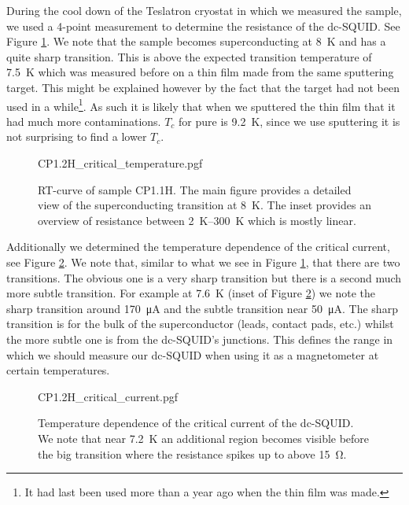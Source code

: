 During the cool down of the Teslatron cryostat in which we measured the sample, we used a 4-point measurement to determine the resistance of the dc-SQUID. See Figure \ref{fig:CP1.1H-SQUID-RT}. We note that the sample becomes superconducting at \qty{8}{\kelvin} and has a quite sharp transition. This is above the expected transition temperature of \qty{7.5}{\kelvin} which was measured before on a thin film made from the same sputtering target. This might be explained however by the fact that the  target had not been used in a while\footnote{It had last been used more than a year ago when the thin film was made.}. As such it is likely that when we sputtered the thin film that it had much more contaminations. $T_c$ for pure  is \qty{9.2}{\kelvin}\cite{maxfieldSuperconductingPenetrationDepth1965}, since we use sputtering it is not surprising to find a lower $T_c$.

\begin{figure}[ht]
	\centering
	{CP1.2H_critical_temperature.pgf}
	\caption{
		RT-curve of sample CP1.1H. The main figure provides a detailed view of the superconducting transition at \qty{8}{\kelvin}. The inset provides an overview of resistance between \qtyrange{2}{300}{\kelvin} which is mostly linear.
	}
	\label{fig:CP1.1H-SQUID-RT}
\end{figure}

Additionally we determined the temperature dependence of the critical current, see Figure \ref{fig:CP1.1H-SQUID-critical-current-temperature-dependence}. We note that, similar to what we see in Figure \ref{fig:CP1.1H-SQUID-RT}, that there are two transitions. The obvious one is a very sharp transition but there is a second much more subtle transition. For example at \qty{7.6}{\kelvin} (inset of Figure \ref{fig:CP1.1H-SQUID-critical-current-temperature-dependence}) we note the sharp transition around \qty{170}{\micro\ampere} and the subtle transition near \qty{50}{\micro\ampere}. The sharp transition is for the bulk of the superconductor (leads, contact pads, etc.) whilst the more subtle one is from the dc-SQUID's junctions. This defines the range in which we should measure our dc-SQUID when using it as a magnetometer at certain temperatures.

\begin{figure}[ht]
	\centering
	{CP1.2H_critical_current.pgf}
	\caption{Temperature dependence of the critical current of the dc-SQUID. We note that near \qty{7.2}{\kelvin} an additional region becomes visible before the big transition where the resistance spikes up to above \qty{15}{\ohm}.}
	\label{fig:CP1.1H-SQUID-critical-current-temperature-dependence}
\end{figure}

